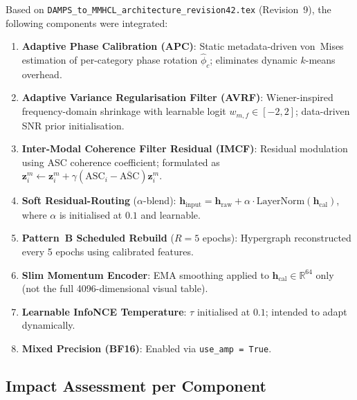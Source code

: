 \documentclass[12pt,a4paper]{article}
\begin{document}
Based on \texttt{DAMPS\_to\_MMHCL\_architecture\_revision42.tex}
(Revision~9), the following components were integrated:

\begin{enumerate}[leftmargin=*]
  \item \textbf{Adaptive Phase Calibration (APC)}: Static metadata-driven
        von~Mises estimation of per-category phase rotation $\hat{\phi}_c$;
        eliminates dynamic $k$-means overhead.
  \item \textbf{Adaptive Variance Regularisation Filter (AVRF)}: Wiener-inspired
        frequency-domain shrinkage with learnable logit
        $w_{m,f} \in [-2, 2]$; data-driven SNR prior initialisation.
  \item \textbf{Inter-Modal Coherence Filter Residual (IMCF)}: Residual
        modulation using ASC coherence coefficient; formulated as
        $\mathbf{z}_i^m \leftarrow \mathbf{z}_i^m
         + \gamma(\text{ASC}_i - \overline{\text{ASC}})\mathbf{z}_i^m$.
  \item \textbf{Soft Residual-Routing} ($\alpha$-blend):
        $\mathbf{h}_{\text{input}} = \mathbf{h}_{\text{raw}}
         + \alpha \cdot \text{LayerNorm}(\mathbf{h}_{\text{cal}})$,
        where $\alpha$ is initialised at $0.1$ and learnable.
  \item \textbf{Pattern~B Scheduled Rebuild} ($R = 5$ epochs): Hypergraph
        reconstructed every 5 epochs using calibrated features.
  \item \textbf{Slim Momentum Encoder}: EMA smoothing applied to
        $\mathbf{h}_{\text{cal}} \in \mathbb{R}^{64}$ only (not the
        full 4096-dimensional visual table).
  \item \textbf{Learnable InfoNCE Temperature}: $\tau$ initialised at
        $0.1$; intended to adapt dynamically.
  \item \textbf{Mixed Precision (BF16)}: Enabled via \texttt{use\_amp = True}.
\end{enumerate}

\subsection{Impact Assessment per Component}
\end{document}
